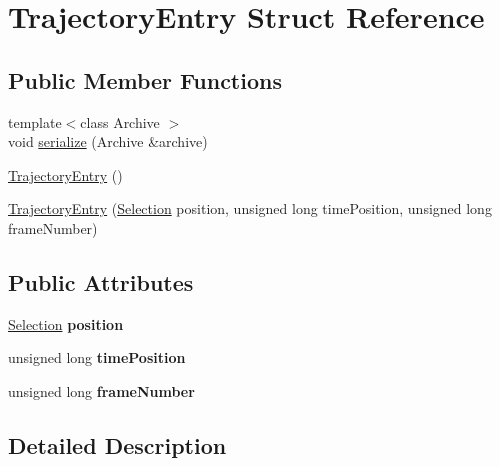 \hypertarget{structTrajectoryEntry}{}\section{Trajectory\+Entry Struct Reference}
\label{structTrajectoryEntry}
\subsection*{Public Member Functions}
\begin{DoxyCompactItemize}
\item 
{\footnotesize template$<$class Archive $>$ }\\void \hyperlink{structTrajectoryEntry_a96f64a74292a9d24b6aef5121274d8d4}{serialize} (Archive \&archive)
\item 
\hyperlink{structTrajectoryEntry_a2276119117656a940535befd0644c2fd}{Trajectory\+Entry} ()
\item 
\hyperlink{structTrajectoryEntry_a17587c6a20683d2c65fad1983ecb202c}{Trajectory\+Entry} (\hyperlink{structSelection}{Selection} position, unsigned long time\+Position, unsigned long frame\+Number)
\end{DoxyCompactItemize}
\subsection*{Public Attributes}
\begin{DoxyCompactItemize}
\item 
\hypertarget{structTrajectoryEntry_a65b78e16f5f374e863e74e2de624fff5}{}\hyperlink{structSelection}{Selection} {\bfseries position}\label{structTrajectoryEntry_a65b78e16f5f374e863e74e2de624fff5}

\item 
\hypertarget{structTrajectoryEntry_a6fa386ac7d02ed2e679054c93a53f665}{}unsigned long {\bfseries time\+Position}\label{structTrajectoryEntry_a6fa386ac7d02ed2e679054c93a53f665}

\item 
\hypertarget{structTrajectoryEntry_a8e9cdcb34e98bcf20a6e7fa4964ff57c}{}unsigned long {\bfseries frame\+Number}\label{structTrajectoryEntry_a8e9cdcb34e98bcf20a6e7fa4964ff57c}

\end{DoxyCompactItemize}


\subsection{Detailed Description}


